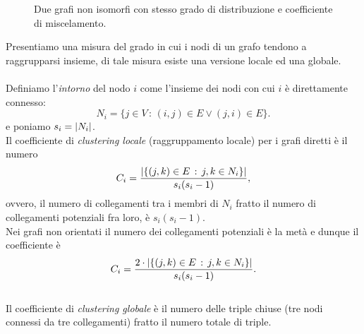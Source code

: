  \begin{figure}[h]
\centering
\subfloat
{
\centering
{}
}  \hfill
{}

\caption{Due grafi non isomorfi con stesso grado di distribuzione e coefficiente di miscelamento.}
\label{fig::esagoni}
\end{figure}

Presentiamo una misura del grado in cui i nodi di un grafo tendono a raggrupparsi insieme, di tale misura esiste una versione locale ed una globale.\\ \\
Definiamo l'\textit{intorno} del nodo $i$ come l'insieme dei nodi con cui $i$ \`e direttamente connesso: 
$$ N_i = \{ j \in V \, :\, (i,j)\in E  \vee (j,i)\in E \}.$$ 
e poniamo $s_i=\left\vert N_i\right\vert$.\\
Il coefficiente di \textit{clustering locale} (raggruppamento locale) per i grafi diretti   \`e il numero 
$$ C_i =\frac{\left\vert \{ (j,k)\in E \, : \, j,k\in N_i\}\right\vert}
{s_i(s_i-1)},$$
ovvero, il numero di collegamenti  tra i membri di $N_i$ fratto il numero di collegamenti potenziali fra loro,  \`e $s_i(s_i-1)$.\\
Nei grafi non orientati il numero dei collegamenti potenziali \`e la met\`a e dunque il coefficiente \`e 
$$ C_i =\frac{2\cdot \left\vert \{ (j,k)\in E \, : \, j,k\in N_i\}\right\vert}
{s_i(s_i-1)}.$$ \\
Il coefficiente di \textit{clustering globale}  \`e il numero delle triple chiuse (tre nodi connessi da tre collegamenti) fratto il numero totale di triple.
